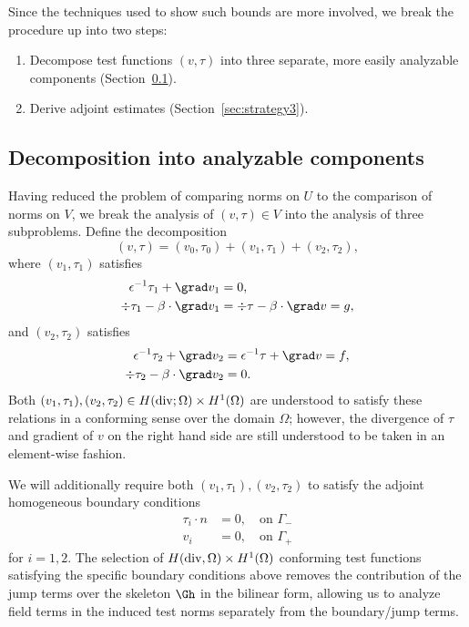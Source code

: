 Since the techniques used to show such bounds are more involved, we break the procedure up into two steps:
\begin{enumerate}
\item{}Decompose test functions $(v,\tau)$ into three separate, more easily analyzable components (Section~\ref{sec:strategy2}).
\item{}Derive adjoint estimates (Section~\ref{sec:strategy3}).
\end{enumerate}

\subsection{Decomposition into analyzable components}
\label{sec:strategy2}

Having reduced the problem of comparing norms on $U$ to the comparison of norms on $V$, we break the analysis of $\left(v,\tau\right) \in V$ into the analysis of three subproblems.  Define the decomposition
\[
\left(v,\tau\right) = \left(v_0,\tau_0\right) + \left(v_1,\tau_1\right) + \left(v_2,\tau_2\right),
\]
where $\left(v_1,\tau_1\right)$ satisfies 
\begin{align*}
\epsilon^{-1}\tau_1 + \grad v_1 &= 0 ,\\
\div \tau_1 - \beta\cdot \grad v_1 &=  \div \tau - \beta\cdot \grad v = g, 
\end{align*} 
and $\left(v_2,\tau_2\right)$ satisfies
\begin{align*}
\epsilon^{-1}\tau_2 + \grad v_2 &= \epsilon^{-1}\tau + \grad v = f, \\
\div \tau_2 - \beta\cdot \grad v_2 &= 0.
\end{align*}
Both $(v_1,\tau_1), (v_2,\tau_2) \in H({\rm div}; \Omega)\times H^1(\Omega)$ are understood to satisfy these relations in a conforming sense over the domain $\Omega$; however, the divergence of $\tau$ and gradient of $v$ on the right hand side are still understood to be taken in an element-wise fashion. 

We will additionally require both $\left(v_1,\tau_1\right), \left(v_2,\tau_2\right)$ to satisfy the adjoint homogeneous boundary conditions
\begin{align}
\tau_i\cdot n &= 0, \quad \text{on }\Gamma_- \label{bc_1}\\
v_i &= 0, \quad \text{on } \Gamma_+ \label{bc_2}
\end{align}
for $i = 1, 2$. The selection of $H({\rm div}, \Omega)\times H^1(\Omega)$ conforming test functions satisfying the specific boundary conditions above removes the contribution of the jump terms over the skeleton $\Gh$ in the bilinear form, allowing us to analyze field terms in the induced test norms separately from  the boundary/jump terms. 

